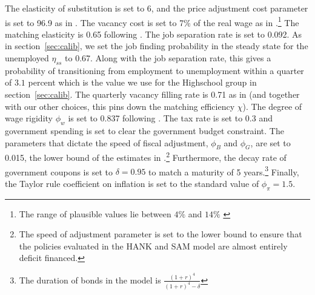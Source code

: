 The elasticity of substitution is set to 6, and the price adjustment cost parameter is set to 96.9 as in \cite{Ravn2017,Ravn2021}.
The vacancy cost is set to 7\% of the real wage as in \cite{Christiano2016}.\footnote{The range of plausible values lie between $4\%$ and $14\%$ \cite{Silva2009}} The matching elasticity is 0.65 following \cite{Ravn2017,Ravn2021}. The job separation rate is set to 0.092. As in section~\ref{sec:calib}, we set the job finding probability in the steady state for the unemployed $\eta_{ss}$ to 0.67. Along with the job separation rate, this gives a probability of transitioning from employment to unemployment within a quarter of $3.1$ percent which is the value we use for the Highschool group in section~\ref{sec:calib}. The quarterly vacancy filling rate is 0.71 as in \cite{DenHaan2000} (and together with our other choices, this pins down the matching efficiency $\chi$). The degree of wage rigidity $\phi_w$ is set to 0.837 following \cite{Gornemann2021}. The tax rate is set to 0.3 and government spending is set to clear the government budget constraint. The parameters that dictate the speed of fiscal adjustment, $\phi_{B}$ and $\phi_{G}$, are set to 0.015, the lower bound of the estimates in \cite{Auclert2020}.\footnote{The speed of adjustment parameter is set to the lower bound to ensure that the policies evaluated in the HANK and SAM model are almost entirely deficit financed.} Furthermore, the decay rate of government coupons is set to $\delta = 0.95$ to match a maturity of 5 years.\footnote{The duration of bonds in the model is $\frac{(1+r)^4}{(1+r)^4 - \delta}$} Finally, the Taylor rule coefficient on inflation is set to the standard value of $\phi_{\pi}=1.5$. 



